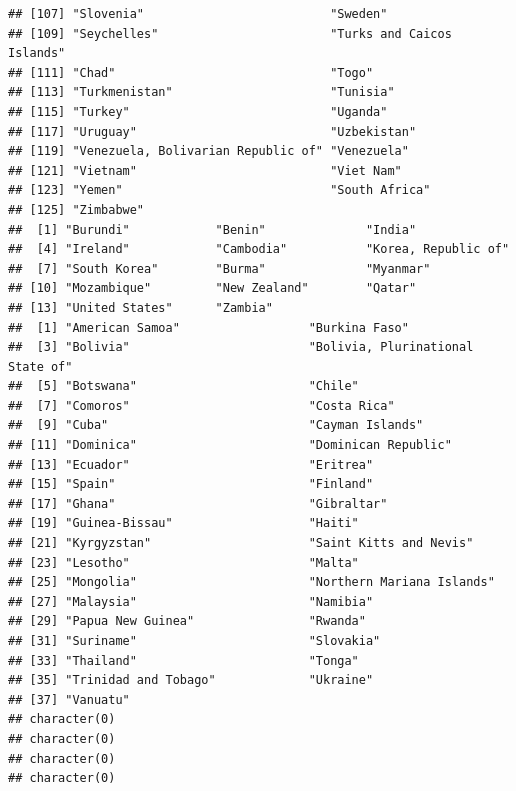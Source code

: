 \documentclass[]{article}
\begin{document}
\begin{verbatim}
## [107] "Slovenia"                          "Sweden"                           
## [109] "Seychelles"                        "Turks and Caicos Islands"         
## [111] "Chad"                              "Togo"                             
## [113] "Turkmenistan"                      "Tunisia"                          
## [115] "Turkey"                            "Uganda"                           
## [117] "Uruguay"                           "Uzbekistan"                       
## [119] "Venezuela, Bolivarian Republic of" "Venezuela"                        
## [121] "Vietnam"                           "Viet Nam"                         
## [123] "Yemen"                             "South Africa"                     
## [125] "Zimbabwe"                         
##  [1] "Burundi"            "Benin"              "India"             
##  [4] "Ireland"            "Cambodia"           "Korea, Republic of"
##  [7] "South Korea"        "Burma"              "Myanmar"           
## [10] "Mozambique"         "New Zealand"        "Qatar"             
## [13] "United States"      "Zambia"            
##  [1] "American Samoa"                  "Burkina Faso"                   
##  [3] "Bolivia"                         "Bolivia, Plurinational State of"
##  [5] "Botswana"                        "Chile"                          
##  [7] "Comoros"                         "Costa Rica"                     
##  [9] "Cuba"                            "Cayman Islands"                 
## [11] "Dominica"                        "Dominican Republic"             
## [13] "Ecuador"                         "Eritrea"                        
## [15] "Spain"                           "Finland"                        
## [17] "Ghana"                           "Gibraltar"                      
## [19] "Guinea-Bissau"                   "Haiti"                          
## [21] "Kyrgyzstan"                      "Saint Kitts and Nevis"          
## [23] "Lesotho"                         "Malta"                          
## [25] "Mongolia"                        "Northern Mariana Islands"       
## [27] "Malaysia"                        "Namibia"                        
## [29] "Papua New Guinea"                "Rwanda"                         
## [31] "Suriname"                        "Slovakia"                       
## [33] "Thailand"                        "Tonga"                          
## [35] "Trinidad and Tobago"             "Ukraine"                        
## [37] "Vanuatu"                        
## character(0)
## character(0)
## character(0)
## character(0)
\end{verbatim}
\end{document}
